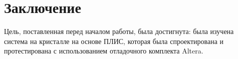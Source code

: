 \chapter*{Заключение}

Цель, поставленная перед началом работы, была достигнута: была изучена система на кристалле на основе ПЛИС, которая была спроектирована и протестирована с использованием отладочного комплекта Altera.

